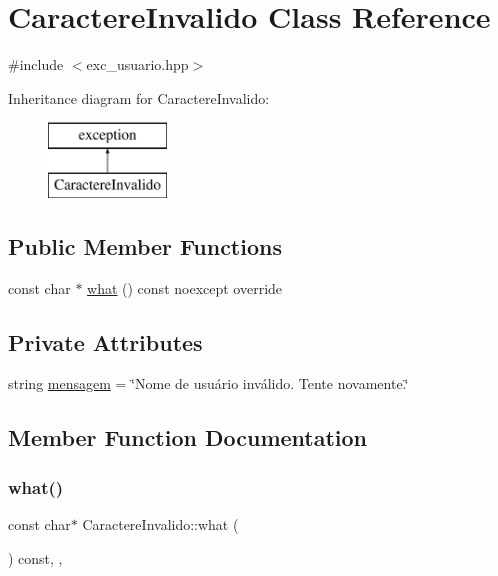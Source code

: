 \hypertarget{classCaractereInvalido}{}\section{Caractere\+Invalido Class Reference}
\label{classCaractereInvalido}


{\ttfamily \#include $<$exc\+\_\+usuario.\+hpp$>$}

Inheritance diagram for Caractere\+Invalido\+:\begin{figure}[H]
\begin{center}
\leavevmode
\includegraphics[height=2.000000cm]{classCaractereInvalido}
\end{center}
\end{figure}
\subsection*{Public Member Functions}
\begin{DoxyCompactItemize}
\item 
const char $\ast$ \hyperlink{classCaractereInvalido_afc8dae97f51348abe6909bd97d5959fb}{what} () const noexcept override
\end{DoxyCompactItemize}
\subsection*{Private Attributes}
\begin{DoxyCompactItemize}
\item 
string \hyperlink{classCaractereInvalido_ad7722f62c4ddc09838c94ef06d540780}{mensagem} = \char`\"{}Nome de usuário inválido. Tente novamente.\char`\"{}
\end{DoxyCompactItemize}


\subsection{Member Function Documentation}
\mbox{\label{classCaractereInvalido_afc8dae97f51348abe6909bd97d5959fb}} 
\subsubsection{\texorpdfstring{what()}{what()}}
{\footnotesize\ttfamily const char$\ast$ Caractere\+Invalido\+::what (\begin{DoxyParamCaption}{ }\end{DoxyParamCaption}) const\hspace{0.3cm}{\ttfamily [inline]}, {\ttfamily [override]}, {\ttfamily [noexcept]}}



